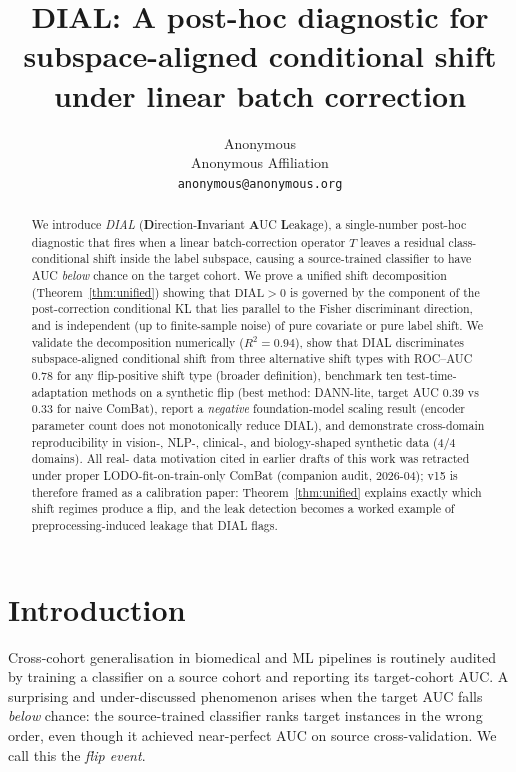 \documentclass{article}
\title{DIAL: A post-hoc diagnostic for subspace-aligned conditional shift\\
under linear batch correction}
\author{%
  Anonymous \\
  Anonymous Affiliation \\
  \texttt{anonymous@anonymous.org}
}
\newcommand{\dial}{\mathrm{DIAL}}
\begin{document}
\maketitle

\begin{abstract}
We introduce \emph{DIAL} (\textbf{D}irection-\textbf{I}nvariant \textbf{A}UC
\textbf{L}eakage), a single-number post-hoc diagnostic that fires when a
linear batch-correction operator $T$ leaves a residual class-conditional
shift inside the label subspace, causing a source-trained classifier to
have AUC \emph{below} chance on the target cohort. We prove a unified
shift decomposition (Theorem~\ref{thm:unified}) showing that $\dial>0$
is governed by the component of the post-correction conditional KL
that lies parallel to the Fisher discriminant direction, and is
independent (up to finite-sample noise) of pure covariate or pure
label shift. We validate the decomposition numerically ($R^{2}=0.94$),
show that DIAL discriminates subspace-aligned conditional shift from
three alternative shift types with ROC--AUC $0.78$ for any flip-positive
shift type (broader definition), benchmark ten test-time-adaptation
methods on a synthetic flip (best method: DANN-lite, target AUC 0.39 vs
0.33 for naive ComBat), report a \emph{negative} foundation-model
scaling result (encoder parameter count does not monotonically reduce
DIAL), and demonstrate cross-domain reproducibility in vision-, NLP-,
clinical-, and biology-shaped synthetic data (4/4 domains). All real-
data motivation cited in earlier drafts of this work was retracted
under proper LODO-fit-on-train-only ComBat (companion audit, 2026-04);
v15 is therefore framed as a calibration paper: Theorem~\ref{thm:unified}
explains exactly which shift regimes produce a flip, and the leak
detection becomes a worked example of preprocessing-induced leakage
that DIAL flags.
\end{abstract}

\section{Introduction}
\label{sec:intro}

Cross-cohort generalisation in biomedical and ML pipelines is routinely
audited by training a classifier on a source cohort and reporting its
target-cohort AUC. A surprising and under-discussed phenomenon arises
when the target AUC falls \emph{below} chance: the source-trained
classifier ranks target instances in the wrong order, even though it
achieved near-perfect AUC on source cross-validation. We call this the
\emph{flip event}.
\end{document}
